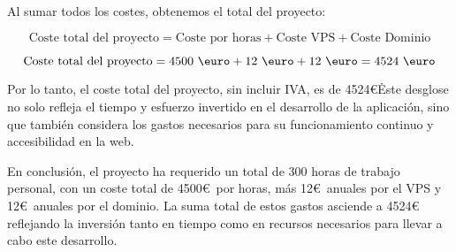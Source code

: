 Al sumar todos los costes, obtenemos el total del proyecto:

\[
\text{Coste total del proyecto} = \text{Coste por horas} + \text{Coste VPS} + \text{Coste Dominio}
\]

\[
\text{Coste total del proyecto} = 4500 \text{ \euro} + 12 \text{ \euro} + 12 \text{ \euro} = 4524 \text{ \euro}
\]

Por lo tanto, el coste total del proyecto, sin incluir IVA, es de 4524\euro\. Este desglose no solo refleja el tiempo y esfuerzo invertido en el desarrollo de la aplicación, sino que también considera los gastos necesarios para su funcionamiento continuo y accesibilidad en la web.

\vspace{0.5cm}

En conclusión, el proyecto ha requerido un total de 300 horas de trabajo personal, con un coste total de 4500\euro\ por horas, más 12\euro\   anuales por el VPS y 12\euro\ anuales por el dominio. La suma total de estos gastos asciende a 4524\euro\, reflejando la inversión tanto en tiempo como en recursos necesarios para llevar a cabo este desarrollo.

